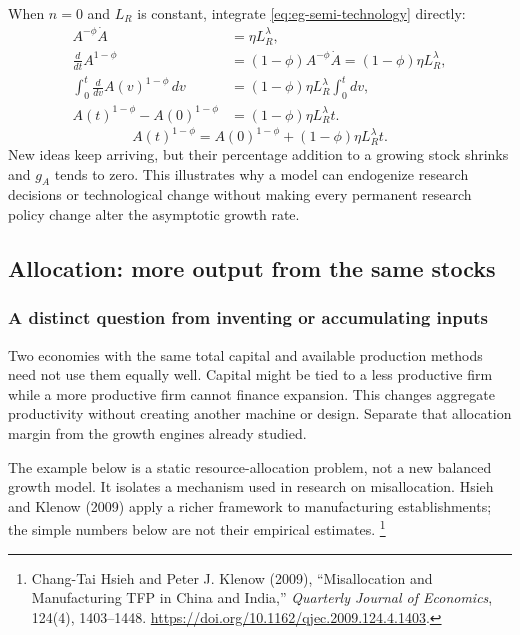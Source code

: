 When $n=0$ and $L_R$ is constant, integrate
\eqref{eq:eg-semi-technology} directly:
\begin{align}
A^{-\phi}\dot A&=\eta L_R^\lambda,\\
\frac{d}{dt}A^{1-\phi}
 &=(1-\phi)A^{-\phi}\dot A=(1-\phi)\eta L_R^\lambda,\\
\int_0^t\frac{d}{dv}A(v)^{1-\phi}\,dv
 &=(1-\phi)\eta L_R^\lambda\int_0^t dv,\\
A(t)^{1-\phi}-A(0)^{1-\phi}
 &=(1-\phi)\eta L_R^\lambda t.
\end{align}
\begin{equation}
A(t)^{1-\phi}=A(0)^{1-\phi}
 +(1-\phi)\eta L_R^\lambda t.
\end{equation}
New ideas keep arriving, but their percentage addition to a growing stock
shrinks and $g_A$ tends to zero. This illustrates why a model can endogenize
research decisions or technological change without making every permanent
research policy change alter the asymptotic growth rate.

\subsection{Allocation: more output from the same stocks}

\subsubsection{A distinct question from inventing or accumulating inputs}

Two economies with the same total capital and available production methods
need not use them equally well. Capital might be tied to a less productive
firm while a more productive firm cannot finance expansion. This changes
aggregate productivity without creating another machine or design. Separate
that allocation margin from the growth engines already studied.

The example below is a static resource-allocation problem, not a new balanced
growth model. It isolates a mechanism used in research on misallocation.
Hsieh and Klenow (2009) apply a richer framework to manufacturing
establishments; the simple numbers below are not their empirical estimates.
\footnote{Chang-Tai Hsieh and Peter J. Klenow (2009), ``Misallocation and
Manufacturing TFP in China and India,'' \textit{Quarterly Journal of Economics},
124(4), 1403--1448. \url{https://doi.org/10.1162/qjec.2009.124.4.1403}.}

